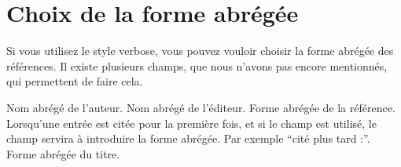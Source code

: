 \cite[24]{Junod1992}


\section{Choix de la forme abrégée}

Si vous utilisez le style verbose, vous pouvez vouloir choisir la forme abrégée des références. Il existe plusieurs champs, que nous n'avons pas encore mentionnés, qui permettent de faire cela.

\begin{fieldlist}
	 Nom abrégé de l'auteur.
	 Nom abrégé de l'éditeur.
	 Forme abrégée de la référence.
	 Lorsqu'une entrée est citée pour la première fois, et si le champ  est utilisé, le champ  servira à introduire la forme abrégée. Par exemple \enquote{cité plus tard :}.
	 Forme abrégée du titre.
\end{fieldlist}

